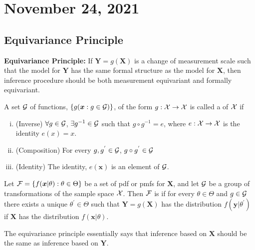 \section{November 24, 2021}
\subsection{Equivariance Principle}
\textbf{Equivariance Principle:} If $\boldsymbol{Y} = g(\boldsymbol{X})$ is a change of measurement scale such that the model for $\boldsymbol{Y}$ has the same formal structure as the model for $\boldsymbol{X}$,  then inference procedure should be both measurement equivariant and formally equivariant. 
\begin{definition}
    A set $\mathcal G$ of functions, $\{ g(\boldsymbol{x}: g \in \mathcal G) \}$, of the form $g: \mathcal X \to \mathcal X$ is called a  of $\mathcal X$ if
    \begin{enumerate}[(i)]
        \item (Inverse) $\forall g \in \mathcal G$, $\exists g^{-1} \in \mathcal G$ such that $g\circ g^{-1} = e$, where $e: \mathcal X \to \mathcal X$ is the identity $e(x) = x$. 
        \item (Composition) For every $g,g^{'} \in \mathcal G$, $g \circ g^{'} \in \mathcal G$
        \item (Identity) The identity, $e(\boldsymbol{x})$ is an element of $\mathcal G$.
    \end{enumerate}
\end{definition}
\begin{definition}[Invariant]
    Let $\mathcal F = \{f(\boldsymbol{x}|\theta): \theta \in \Theta \}$ be a set of pdf or pmfs for $\boldsymbol{X}$, and let $\mathcal G$ be a group of transformations of the  sample space $\mathcal X$. Then $\mathcal F$ is  if for every $\theta \in \Theta$ and $g \in \mathcal G$ there exists a unique $\theta^{'} \in \Theta$ such that $\boldsymbol{Y} = g(\boldsymbol{X})$ has the distribution $f(\boldsymbol{y}|\theta^{'})$ if $\boldsymbol{X}$ has the distribution $f(\boldsymbol{x}|\theta)$.
\end{definition}
The equivariance principle essentially says that inference based on $\boldsymbol{X}$ should be the same as inference based on $\boldsymbol{Y}$.
\begin{example}

\end{example}
\begin{example}

\end{example}
